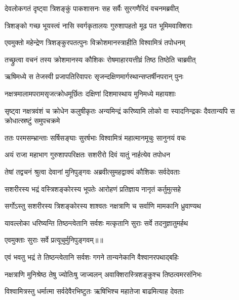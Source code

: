 \twolineshloka
{देवलोकगतं दृष्ट्वा त्रिशङ्कुं पाकशासनः}
{सह सर्वैः सुरगणैरिदं वचनमब्रवीत्} %

\twolineshloka
{त्रिशङ्को गच्छ भूयस्त्वं नासि स्वर्गकृतालयः}
{गुरुशापहतो मूढ पत भूमिमवाक्शिराः} %

\twolineshloka
{एवमुक्तो महेन्द्रेण त्रिशङ्कुरपतत्पुनः}
{विक्रोशमानस्त्राहीति विश्वामित्रं तपोधनम्} %

\twolineshloka
{तच्छ्रुत्वा वचनं तस्य क्रोशमानस्य कौशिकः}
{रोषमाहारयत्तीव्रं तिष्ठ तिष्ठेति चाब्रवीत्} %

\twolineshloka
{ऋषिमध्ये स तेजस्वी प्रजापतिरिवापरः}
{सृजन्दक्षिणमार्गस्थान्सप्तर्षीनपरान् पुनः} %

\twolineshloka
{नक्षत्रमालामपरामसृजत्क्रोधमूर्छितः}
{दक्षिणां दिशमास्थाय मुनिमध्ये महायशाः} %

\threelineshloka
{सृष्ट्वा नक्षत्रवंशं च क्रोधेन कलुषीकृतः}
{अन्यमिन्द्रं करिष्यामि लोको वा स्यादनिन्द्रकः}
{दैवतान्यपि स क्रोधात्स्रष्टुं समुपचक्रमे} %

\twolineshloka
{ततः परमसम्भ्रान्ताः सर्षिसङ्घाः सुरर्षभाः}
{विश्वामित्रं महात्मानमूचुः सानुनयं वचः} %

\twolineshloka
{अयं राजा महाभाग गुरुशापपरिक्षतः}
{सशरीरो दिवं यातुं नार्हत्येव तपोधन} %

\twolineshloka
{तेषां तद्वचनं श्रुत्वा देवानां मुनिपुङ्गवः}
{अब्रवीत्सुमहद्वाक्यं कौशिकः सर्वदेवताः} %

\twolineshloka
{सशरीरस्य भद्रं वस्त्रिशङ्कोरस्य भूपतेः}
{आरोहणं प्रतिज्ञाय नानृतं कर्तुमुत्सहे} %

\twolineshloka
{सर्गोऽस्तु सशरीरस्य त्रिशङ्कोरस्य शाश्वतः}
{नक्षत्राणि च सर्वाणि मामकानि ध्रुवाण्यथ} %

\twolineshloka
{यावल्लोका धरिष्यन्ति तिष्ठन्त्वेतानि सर्वशः}
{मत्कृतानि सुराः सर्वे तदनुज्ञातुमर्हथ} %

{एवमुक्ताः सुराः सर्वे प्रत्यूचुर्मुनिपुङ्गवम्॥॥} %

\addtocounter{shlokacount}{1}

\twolineshloka
{एवं भवतु भद्रं ते तिष्ठन्त्वेतानि सर्वशः}
{गगने तान्यनेकानि वैश्वानरपथाद्बहिः} %

\twolineshloka
{नक्षत्राणि मुनिश्रेष्ठ तेषु ज्योतिःषु जाज्वलन्}
{अवाक्शिरास्त्रिशङ्कुश्च तिष्ठत्वमरसंनिभः} %

\twolineshloka
{विश्वामित्रस्तु धर्मात्मा सर्वदेवैरभिष्टुतः}
{ऋषिभिश्च महातेजा बाढमित्याह देवताः} %

